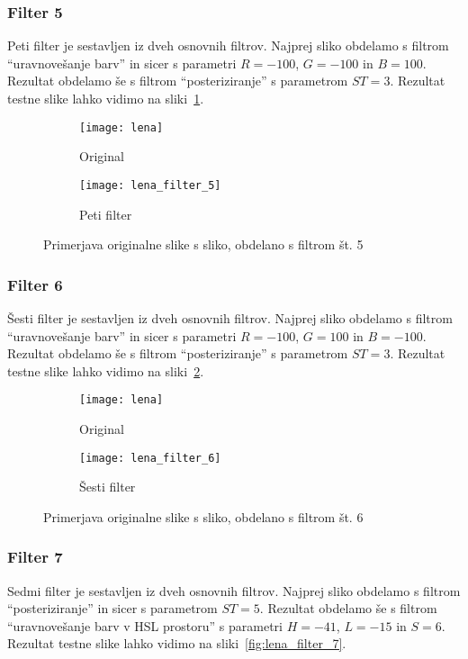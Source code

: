 \subsubsection*{Filter 5}
Peti filter je sestavljen iz dveh osnovnih filtrov. Najprej sliko obdelamo s
filtrom ``uravnovešanje barv'' in sicer s parametri $R = -100$, $G = -100$ in
$B = 100$. Rezultat obdelamo še s filtrom ``posteriziranje'' s parametrom
$ST = 3$. Rezultat testne slike lahko vidimo na sliki~\ref{fig:lena_filter_5}.

\begin{figure}[!ht]
    \centering
    \begin{subfigure}[b]{0.4\textwidth}
        \texttt{[image: lena]}
        \caption{Original}
    \end{subfigure}
    \begin{subfigure}[b]{0.4\textwidth}
        \texttt{[image: lena\_filter\_5]}
        \caption{Peti filter}
    \end{subfigure}
    \caption{Primerjava originalne slike s sliko, obdelano s filtrom št. 5}
    \label{fig:lena_filter_5}
\end{figure}


\subsubsection*{Filter 6}
Šesti filter je sestavljen iz dveh osnovnih filtrov. Najprej sliko obdelamo s
filtrom ``uravnovešanje barv'' in sicer s parametri $R = -100$, $G = 100$ in
$B = -100$. Rezultat obdelamo še s filtrom ``posteriziranje'' s parametrom
$ST = 3$. Rezultat testne slike lahko vidimo na sliki~\ref{fig:lena_filter_6}.

\begin{figure}[!ht]
    \centering
    \begin{subfigure}[b]{0.4\textwidth}
        \texttt{[image: lena]}
        \caption{Original}
    \end{subfigure}
    \begin{subfigure}[b]{0.4\textwidth}
        \texttt{[image: lena\_filter\_6]}
        \caption{Šesti filter}
    \end{subfigure}
    \caption{Primerjava originalne slike s sliko, obdelano s filtrom št. 6}
    \label{fig:lena_filter_6}
\end{figure}


\subsubsection*{Filter 7}
Sedmi filter je sestavljen iz dveh osnovnih filtrov. Najprej sliko obdelamo s
filtrom ``posteriziranje'' in sicer s parametrom $ST = 5$. Rezultat obdelamo
še s filtrom ``uravnovešanje barv v HSL prostoru'' s parametri $H = -41$,
$L = -15$ in $S = 6$. Rezultat testne slike lahko vidimo na
sliki~\ref{fig:lena_filter_7}.

